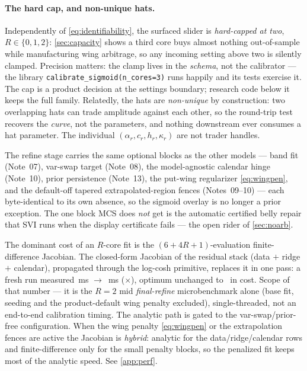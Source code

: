 \documentclass[11pt]{article}
\begin{document}
\paragraph{The hard cap, and non-unique hats.}
Independently of \eqref{eq:identifiability}, the surfaced slider is
\emph{hard-capped at two}, $R\in\{0,1,2\}$: \cref{sec:capacity} shows a third
core buys almost nothing out-of-sample while manufacturing wing arbitrage, so
any incoming setting above two is silently clamped.  Precision matters: the
clamp lives in the \emph{schema}, not the calibrator --- the library
\texttt{calibrate\_sigmoid(n\_cores=3)} runs happily and its tests exercise it.
The cap is a product decision at the settings boundary; research code below it
keeps the full family.  Relatedly, the hats are \emph{non-unique} by
construction: two overlapping hats can trade amplitude against each other, so
the round-trip test recovers the \emph{curve}, not the parameters, and nothing
downstream ever consumes a hat parameter.  The individual
$(\alpha_r,c_r,h_r,\kappa_r)$ are not trader handles.

The refine stage carries the same optional blocks as the other models --- band
fit (Note~07), var-swap target (Note~08), the model-agnostic calendar hinge
(Note~10), prior persistence (Note~13), the put-wing regularizer
\eqref{eq:wingpen}, and the default-off tapered extrapolated-region fences
(Notes~09--10) --- each byte-identical to its own absence, so the sigmoid
overlay is no longer a prior exception.  The one block MCS does \emph{not}
get is the automatic certified belly repair that SVI runs when the display
certificate fails --- the open rider of \cref{sec:noarb}.

\begin{perfbox}
The dominant cost of an $R$-core fit is the $(6+4R+1)$-evaluation
finite-difference Jacobian.  The closed-form Jacobian of the residual stack
(data $+$ ridge $+$ calendar), propagated through the log-cosh primitive,
replaces it in one pass: a fresh run measured \mcscorrfdms\,ms $\to$
\mcscorranalyticms\,ms (\mcscorrspeedup$\times$), optimum unchanged to
\mcscorrcostdiff\ in cost.  Scope of that number --- it is the $R=2$ mid
\emph{final-refine} microbenchmark alone (base fit, seeding and the
product-default wing penalty excluded), single-threaded, not an end-to-end
calibration timing.  The analytic path is gated to the var-swap/prior-free
configuration.  When the wing penalty \eqref{eq:wingpen} or the extrapolation
fences are active the Jacobian is \emph{hybrid}: analytic for the
data/ridge/calendar rows and finite-difference only for the small penalty
blocks, so the penalized fit keeps most of the analytic speed.  See
\cref{app:perf}.
\end{perfbox}
\end{document}
